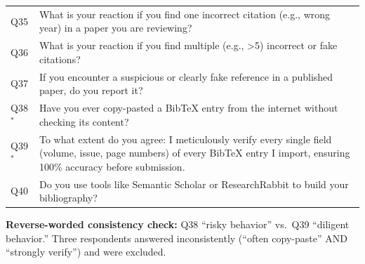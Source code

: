 \begin{table}[htbp]
\begin{threeparttable}
\begin{tabular}{p{1.2cm}p{14.2cm}}
Q35 & What is your reaction if you find one incorrect citation (e.g., wrong year) in a paper you are reviewing? \\
Q36 & What is your reaction if you find multiple (e.g., >5) incorrect or fake citations? \\
Q37 & If you encounter a suspicious or clearly fake reference in a published paper, do you report it? \\
Q38$^*$ & Have you ever copy-pasted a BibTeX entry from the internet without checking its content? \\
Q39$^*$ & To what extent do you agree: I meticulously verify every single field (volume, issue, page numbers) of every BibTeX entry I import, ensuring 100\% accuracy before submission. \\
Q40 & Do you use tools like Semantic Scholar or ResearchRabbit to build your bibliography? \\
\bottomrule
\end{tabular}
\begin{tablenotes}
    \footnotesize
    \textbf{Reverse-worded consistency check:} Q38 ``risky behavior'' vs.~Q39 ``diligent behavior.'' Three respondents answered inconsistently (``often copy-paste'' AND ``strongly verify'') and were excluded.
\end{tablenotes}
\end{threeparttable}
\end{table}
